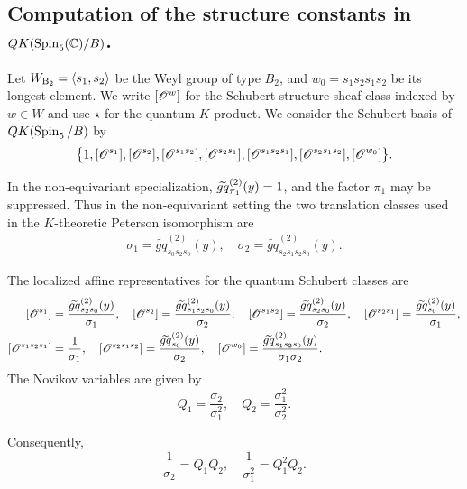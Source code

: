\documentclass[a4paper]{amsart}
\theoremstyle{remark}
\numberwithin{equation}{section}
\begin{document}
\subsection{Computation of the structure constants in $QK(\Spin_5(\C)/B)$.}

Let $\WB{2}=\langle s_1,s_2\rangle$ be the Weyl group of type $B_2$, and $w_0=s_1s_2s_1s_2$
be its longest element.  We write $\cOO{w}$ for the Schubert structure-sheaf
class indexed by $w\in W$ and use $\star$ for the quantum $K$-product. We consider the Schubert basis of
\(QK(\Spin_5/B)\) by
\[
 \bigl\{1,\cOO{s_1},\cOO{s_2},\cOO{s_1s_2},\cOO{s_2s_1},
 \cOO{s_1s_2s_1},\cOO{s_2s_1s_2},\cOO{w_0}\bigr\}.
\]

In the non-equivariant specialization, $\tgq{\pi_1}{2}(y)=1$, and the factor $\pi_1$ may be suppressed. Thus in the non-equivariant setting the two translation classes used in the $K$-theoretic Peterson isomorphism are
\begin{align*}
\sigma_1=\widetilde{gq}_{s_0s_2s_0}^{(2)}(y), \quad
 \sigma_2=\widetilde{gq}_{s_2s_1s_2s_0}^{(2)}(y). 
\end{align*}

The localized affine representatives for the quantum Schubert classes are
\begin{align*}
\cOO{s_1}&=\frac{\widetilde{gq}_{s_2s_0}^{(2)}(y)}{\sigma_1},\quad
\cOO{s_2}=\frac{\widetilde{gq}_{s_1s_2s_0}^{(2)}(y)}{\sigma_2},\quad
\cOO{s_1s_2}=\frac{\widetilde{gq}_{s_2s_0}^{(2)}(y)}{\sigma_2},\quad
\cOO{s_2s_1}=\frac{\widetilde{gq}_{s_0}^{(2)}(y)}{\sigma_1},\\
\cOO{s_1s_2s_1}&=\frac{1}{\sigma_1},\quad
\cOO{s_2s_1s_2}=\frac{\widetilde{gq}_{s_0}^{(2)}(y)}{\sigma_2},\quad
\cOO{w_0}=\frac{\widetilde{gq}^{(2)}_{ s_1s_2s_0}(y)}{\sigma_1\sigma_2}.
\end{align*}
The Novikov variables are given by
\[Q_1=\frac{\sigma_2}{\sigma_1^2},\quad  Q_2=\frac{\sigma_1^2}{\sigma_2^2}.\]

Consequently,
$$\frac{1}{\sigma_2}=Q_1Q_2, \quad \frac{1}{\sigma_1^2}=Q_1^2Q_2. $$

\end{document}

